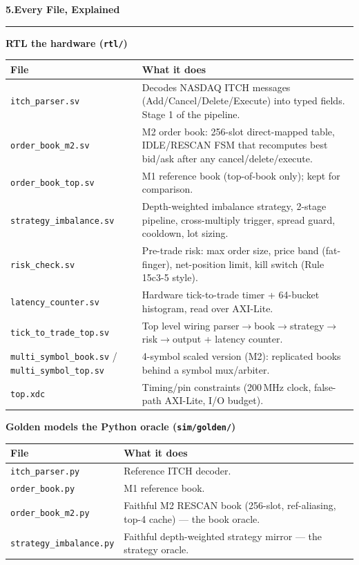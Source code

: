 \documentclass[10pt,a4paper]{article}
\newcommand{\sectionrule}{\par\nobreak\vspace{1pt}\textcolor{rulegray}{\rule{\linewidth}{0.8pt}}\par\vspace{1pt}}
\newcommand{\fpath}[1]{\texttt{\textcolor{hdrblue}{#1}}}
\begin{document}
\newpage
{\large\bfseries\color{hdrblue} 5.\quad Every File, Explained}
\sectionrule

{\bfseries\color{hdrblue} RTL \textendash{} the hardware (\fpath{rtl/})}
\vspace{2pt}
\begin{center}\small
\renewcommand{\arraystretch}{1.2}
\begin{tabularx}{\linewidth}{@{}l X@{}}
\toprule
\textbf{File} & \textbf{What it does} \\
\midrule
\fpath{itch\_parser.sv}        & Decodes NASDAQ ITCH messages (Add/Cancel/Delete/Execute) into typed fields. Stage 1 of the pipeline. \\
\fpath{order\_book\_m2.sv}     & M2 order book: 256-slot direct-mapped table, IDLE/RESCAN FSM that recomputes best bid/ask after any cancel/delete/execute. \\
\fpath{order\_book\_top.sv}    & M1 reference book (top-of-book only); kept for comparison. \\
\fpath{strategy\_imbalance.sv} & Depth-weighted imbalance strategy, 2-stage pipeline, cross-multiply trigger, spread guard, cooldown, lot sizing. \\
\fpath{risk\_check.sv}         & Pre-trade risk: max order size, price band (fat-finger), net-position limit, kill switch (Rule 15c3-5 style). \\
\fpath{latency\_counter.sv}    & Hardware tick-to-trade timer + 64-bucket histogram, read over AXI-Lite. \\
\fpath{tick\_to\_trade\_top.sv}& Top level wiring parser$\to$book$\to$strategy$\to$risk$\to$output + latency counter. \\
\fpath{multi\_symbol\_book.sv} / \fpath{multi\_symbol\_top.sv} & 4-symbol scaled version (M2): replicated books behind a symbol mux/arbiter. \\
\fpath{top.xdc}                & Timing/pin constraints (200\,MHz clock, false-path AXI-Lite, I/O budget). \\
\bottomrule
\end{tabularx}
\end{center}

{\bfseries\color{accentteal} Golden models \textendash{} the Python oracle (\fpath{sim/golden/})}
\vspace{2pt}
\begin{center}\small
\renewcommand{\arraystretch}{1.2}
\begin{tabularx}{\linewidth}{@{}l X@{}}
\toprule
\textbf{File} & \textbf{What it does} \\
\midrule
\fpath{itch\_parser.py}      & Reference ITCH decoder. \\
\fpath{order\_book.py}       & M1 reference book. \\
\fpath{order\_book\_m2.py}   & Faithful M2 RESCAN book (256-slot, ref-aliasing, top-4 cache) --- the book oracle. \\
\fpath{strategy\_imbalance.py}& Faithful depth-weighted strategy mirror --- the strategy oracle. \\
\bottomrule
\end{tabularx}
\end{center}
\end{document}

